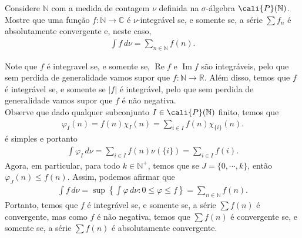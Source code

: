 \begin{homeworkProblem}[3]
  Considere $\mathbb{N}$ com a medida de contagem $\nu$ definida na $\sigma$-álgebra $\cali{P}(\mathbb{N})$. Mostre que uma função $f:\mathbb{N}\to\mathbb{C}$ é $\nu$-integrável se, e somente se, a série $\sum f_n$ é absolutamente convergente e, neste caso,
  \begin{align*}
    \int f\,d\nu=\sum_{n\in\mathbb{N}}f(n).
  \end{align*}
  \begin{solution}
    Note que $f$ é integravel se, e somente se, $\operatorname{Re}f$ e $\operatorname{Im}f$ são integráveis, pelo que sem perdida de generalidade vamos supor que $f:\mathbb{N}\to\mathbb{R}$. Além disso, temos que $f$ é integrável se, e somente se $|f|$ é integrável, pelo que sem perdida de generalidade vamos supor que $f$ é não negativa.\\ 
    Observe que dado qualquer subconjunto $I\in \cali{P}(\mathbb{N})$ finito, temos que
    \begin{align*}
      \varphi_{I}(n)=f(n)\chi_{I}(n)=\sum_{i\in I}f(n)\chi_{\{i\}}(n).
    \end{align*}
    é simples e portanto
    \begin{align*}
      \int \varphi_I\,d\nu=\sum_{i\in I}f(n)\nu(\{i\})=\sum_{i\in I}f(i).
    \end{align*}
    Agora, em particular, para todo $k\in\mathbb{N}^{+}$, temos que se $J=\{0,\cdots,k\}$, então $\varphi_J(n)\leq f(n)$. Assim, podemos afirmar que
    \begin{align*}
      \int f\,d\nu=\sup\left\{ \int \varphi\,d\nu: 0\leq \varphi\leq f \right\}=\sum_{n\in\mathbb{N}}f(n).
    \end{align*}
    Portanto, temos que $f$ é integrável se, e somente se, a série $\sum f(n)$ é convergente, mas como $f$ é não negativa, temos que $\sum f(n)$ é convergente se, e somente se, a série $\sum f(n)$ é absolutamente convergente. 
  \end{solution}
\end{homeworkProblem}
